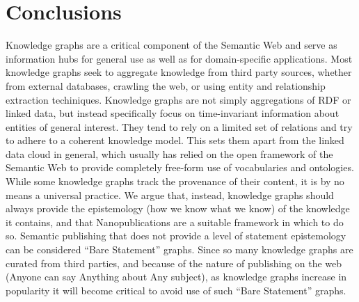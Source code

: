 \section{Conclusions}

Knowledge graphs are a critical component of the Semantic Web and serve as information hubs for general use as well as for domain-specific applications.
Most knowledge graphs seek to aggregate knowledge from third party sources, whether from external databases, crawling the web, or using entity and relationship extraction techiniques.
Knowledge graphs are not simply aggregations of RDF or linked data, but instead specifically focus on time-invariant information about entities of general interest.
They tend to rely on a limited set of relations and try to adhere to a coherent knowledge model.
This sets them apart from the linked data cloud in general, which usually has relied on the open framework of the Semantic Web to provide completely free-form use of vocabularies and ontologies.
While some knowledge graphs track the provenance of their content, it is by no means a universal practice.
We argue that, instead, knowledge graphs should always provide the epistemology (how we know what we know) of the knowledge it contains, and that Nanopublications are a suitable framework in which to do so.
Semantic publishing that does not provide a level of statement epistemology can be considered ``Bare Statement'' graphs.
Since so many knowledge graphs are curated from third parties, and because of the nature of publishing on the web (Anyone can say Anything about Any subject), as knowledge graphs increase in popularity it will become critical to avoid use of such ``Bare Statement'' graphs.